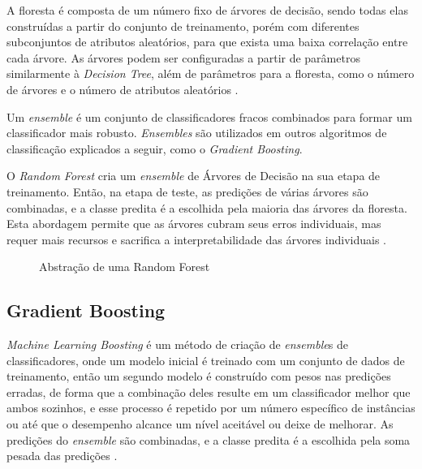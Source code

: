 A floresta é composta de um número fixo de árvores de decisão, sendo todas elas construídas a partir do conjunto de treinamento, porém com diferentes subconjuntos de atributos aleatórios, para que exista uma baixa correlação entre cada árvore. 
As árvores podem ser configuradas a partir de parâmetros similarmente à \textit{Decision Tree}, além de parâmetros para a floresta, como o número de árvores e o número de atributos aleatórios \cite{rforest}.

Um \textit{ensemble} é um conjunto de classificadores fracos combinados para formar um classificador mais robusto. \textit{Ensembles} são utilizados em outros algoritmos de classificação explicados a seguir, como o \textit{Gradient Boosting}.

O \textit{Random Forest} cria um \textit{ensemble} de Árvores de Decisão na sua etapa de treinamento. Então, na etapa de teste, as predições de várias árvores são combinadas, e a classe predita é a escolhida pela maioria das árvores da floresta. Esta abordagem permite que as árvores cubram seus erros individuais, mas requer mais recursos e sacrifica a interpretabilidade das árvores individuais \cite{rforest-tom}.

\begin{figure}[ht!]
  \centering
  \caption{\textmd{Abstração de uma Random Forest}}
  \label{fig:rf-exemplo}
\end{figure}

\subsection{Gradient Boosting}
\label{subsec:contexto-gradient-boosting}

\textit{Machine Learning Boosting} é um método de criação de \textit{ensemble}s de classificadores, onde um modelo inicial é treinado com um conjunto de dados de treinamento, então um segundo modelo é construído com pesos nas predições erradas, de forma que a combinação deles resulte em um classificador melhor que ambos sozinhos, e esse processo é repetido por um número específico de instâncias ou até que o desempenho alcance um nível aceitável ou deixe de melhorar. As predições do \textit{ensemble} são combinadas, e a classe predita é a escolhida pela soma pesada das predições \cite{gb-towards}.

